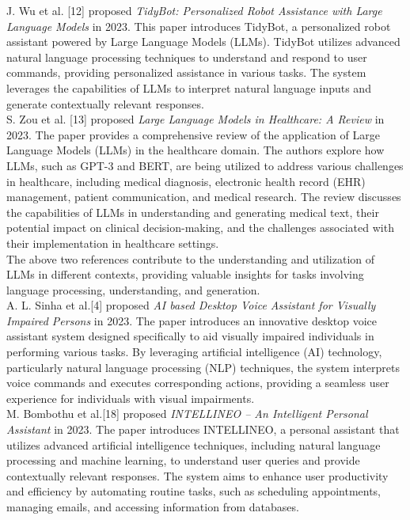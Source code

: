 \noindent
J. Wu et al. [12] proposed {\it TidyBot: Personalized Robot Assistance with Large Language Models} in 2023.
\noindent
This paper introduces TidyBot, a personalized robot assistant powered by Large Language Models (LLMs). TidyBot utilizes advanced natural language processing techniques to understand and respond to user commands, providing personalized assistance in various tasks. The system leverages the capabilities of LLMs to interpret natural language inputs and generate contextually relevant responses.\\

\noindent
S. Zou et al. [13] proposed {\it Large Language Models in Healthcare: A Review} in 2023. 
\noindent
The paper provides a comprehensive review of the application of Large Language Models (LLMs) in the healthcare domain. The authors explore how LLMs, such as GPT-3 and BERT, are being utilized to address various challenges in healthcare, including medical diagnosis, electronic health record (EHR) management, patient communication, and medical research. The review discusses the capabilities of LLMs in understanding and generating medical text, their potential impact on clinical decision-making, and the challenges associated with their implementation in healthcare settings.\\

\noindent
The above two references contribute to the understanding and utilization of LLMs in different contexts, providing valuable insights for tasks involving language processing, understanding, and generation.\\

\noindent
A. L. Sinha et al.[4] proposed {\it AI based Desktop Voice Assistant for Visually Impaired Persons} in 2023.
\noindent
The paper introduces an innovative desktop voice assistant system designed specifically to aid visually impaired individuals in performing various tasks. By leveraging artificial intelligence (AI) technology, particularly natural language processing (NLP) techniques, the system interprets voice commands and executes corresponding actions, providing a seamless user experience for individuals with visual impairments.\\

\noindent
M. Bombothu et al.[18] proposed {\it INTELLINEO – An Intelligent Personal Assistant} in 2023.
\noindent
The paper introduces INTELLINEO, a personal assistant that utilizes advanced artificial intelligence techniques, including natural language processing and machine learning, to understand user queries and provide contextually relevant responses. The system aims to enhance user productivity and efficiency by automating routine tasks, such as scheduling appointments, managing emails, and accessing information from databases. \\

